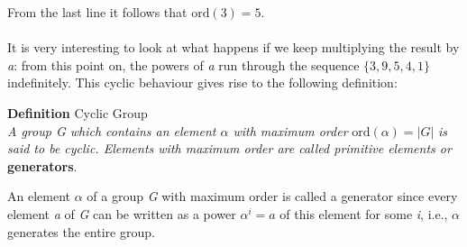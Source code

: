 \documentclass[11pt, a4paper]{article}
\begin{document}
From the last line it follows that $\text{ord}(3)=5$.\\\\
It is very interesting to look at what happens if we keep multiplying the result by \textit{a}: from this point on, the powers of \textit{a} run through the sequence $\{3,9,5,4,1\}$ indefinitely. This cyclic behaviour gives rise to the following definition:
\begin{framed}
    \hfill\break\textbf{Definition} Cyclic Group\\
    \textit{A group G which contains an element $\alpha$ with maximum order} $\text{ord}(\alpha)=|G|$ \textit{is said to be cyclic. Elements with maximum order are called primitive elements or} \textbf{generators}. 
\end{framed}
\hfill\break
An element $\alpha$ of a group \textit{G} with maximum order is called a generator since every element \textit{a} of \textit{G} can be written as a power $\alpha^i=a$ of this element for some \textit{i}, i.e., $\alpha$ generates the entire group.
\end{document}

